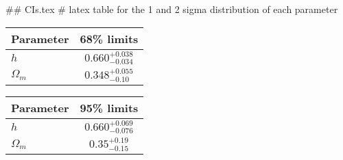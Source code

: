 ## CIs.tex
# latex table for the 1 and 2 sigma distribution of each parameter

\begin{tabular} { l  c}
 Parameter &  68\% limits\\
\hline
{\boldmath$h              $} & $0.660^{+0.038}_{-0.034}   $\\
{\boldmath$\Omega_m       $} & $0.348^{+0.055}_{-0.10}    $\\
\hline
\end{tabular}

\begin{tabular} { l  c}
 Parameter &  95\% limits\\
\hline
{\boldmath$h              $} & $0.660^{+0.069}_{-0.076}   $\\
{\boldmath$\Omega_m       $} & $0.35^{+0.19}_{-0.15}      $\\
\hline
\end{tabular}
